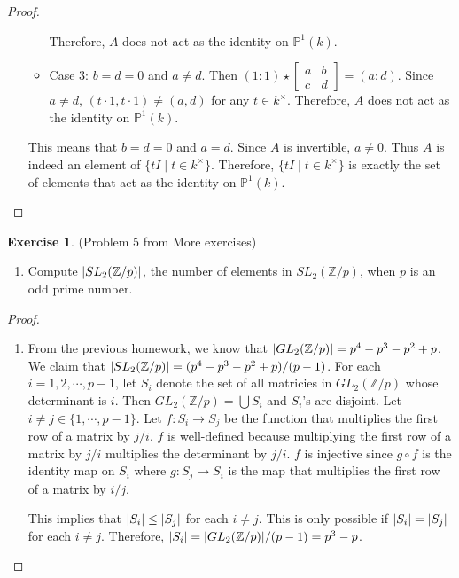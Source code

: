 \documentclass[12pt, psamsfonts]{amsart}
\theoremstyle{definition}
\newtheorem*{exer}{Exercise}
\theoremstyle{remark}
\numberwithin{equation}{section}
\begin{document}
\begin{proof}
\begin{enumerate}
\begin{itemize}
          Therefore, $A$ does not act as the identity on $\mathbb{P}^1(k)$.
        \item
          Case 3: $b = d = 0$ and $a \ne d$.
          Then $(1 : 1) \star \begin{bmatrix} a & b \\ c & d \end{bmatrix} = (a : d)$.
          Since $a \ne d$, $(t \cdot 1, t \cdot 1) \ne (a, d)$ for any $t \in k^{\times}$.
          Therefore, $A$ does not act as the identity on $\mathbb{P}^1(k)$.
      \end{itemize}
      This means that $b = d = 0$ and $a = d$.
      Since $A$ is invertible, $a \ne 0$.
      Thus $A$ is indeed an element of $\{ tI \mid t \in k^{\times} \}$.
      Therefore, $\{ tI \mid t \in k^{\times} \}$ is exactly the set of elements that act as the identity on $\mathbb{P}^1(k)$.
  \end{enumerate}
\end{proof}

\begin{exer}{(Problem 5 from More exercises)}
  $ $
  \begin{enumerate}
    \item
      Compute $\abs{SL_2(\mathbb{Z}/p)}$, the number of elements in $SL_2(\mathbb{Z}/p)$, when $p$ is an odd prime number.
  \end{enumerate}
\end{exer}

\begin{proof}
  $ $
  \begin{enumerate}
    \item
      From the previous homework, we know that $\abs{GL_2(\mathbb{Z}/p)} = p^4 - p^3 - p^2 + p$.
      We claim that $\abs{SL_2(\mathbb{Z}/p)} = (p^4 - p^3 - p^2 + p) / (p - 1)$.
      For each $i = 1, 2, \cdots, p - 1$, let $S_i$ denote the set of all matricies in $GL_2(\mathbb{Z}/p)$ whose determinant is $i$.
      Then $GL_2(\mathbb{Z}/p) = \bigcup S_i$ and $S_i$'s are disjoint.
      Let $i \ne j \in \{ 1, \cdots, p - 1 \}$.
      Let $f: S_i \rightarrow S_j$ be the function that multiplies the first row of a matrix by $j / i$.
      $f$ is well-defined because multiplying the first row of a matrix by $j / i$ multiplies the determinant by $j /i$.
      $f$ is injective since $g \circ f$ is the identity map on $S_i$ where $g: S_j \rightarrow S_i$ is the map that multiplies the first row of a matrix by $i / j$.

      This implies that $\abs{S_i} \leq \abs{S_j}$ for each $i \neq j$.
      This is only possible if $\abs{S_i} = \abs{S_j}$ for each $i \ne j$.
      Therefore, $\abs{S_i} = \abs{GL_2(\mathbb{Z}/p)} / (p - 1) = p^3 - p$.
  \end{enumerate}
\end{proof}
\end{document}
